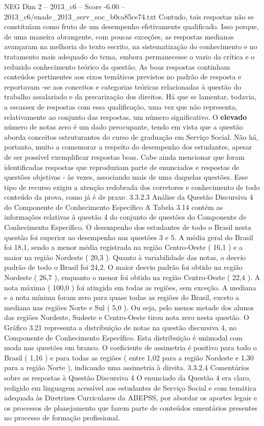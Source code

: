 \begin{textsample}{NEG Dim 2 – 2013\_c6 – Score -6.00 – 2013\_c6/enade\_2013\_serv\_soc\_b0ca85ce74.txt}
Contudo, tais respostas não se constituíam como fruto de um desempenho efetivamente qualificado.
Isso porque, de uma maneira abrangente, com poucas exceções, as respostas medianas avançaram na melhoria do texto escrito, na sistematização do conhecimento e no tratamento mais adequado do tema, embora permanecesse o vazio da crítica e o reduzido conhecimento teórico da questão.
As boas respostas continham conteúdos pertinentes aos eixos temáticos previstos no padrão de resposta e reportavam -se aos conceitos e categorias teóricas relacionadas à questão do trabalho assalariado e da precarização dos direitos.
Há que se lamentar, todavia, a escassez de respostas com essa qualificação, uma vez que não representa, relativamente ao conjunto das respostas, um número significativo.
O \textbf{elevado} número de notas zero é um dado preocupante, tendo em vista que a questão aborda conceitos estruturantes do curso de graduação em Serviço Social.
Não há, portanto, muito a comemorar a respeito do desempenho dos estudantes, apesar de ser possível exemplificar respostas boas.
Cabe ainda mencionar que foram identificadas respostas que reproduziam parte de enunciados e respostas de questões objetivas - às vezes, associando mais de uma daquelas questões.
Esse tipo de recurso exigiu a atenção redobrada dos corretores e conhecimento de todo conteúdo da prova, como já é de praxe. 3.3.2.3 Análise da Questão Discursiva 4 do Componente de Conhecimento Específico A Tabela 3.14 contém as informações relativas à questão 4 do conjunto de questões do Componente de Conhecimento Específico.
O desempenho dos estudantes de todo o Brasil nesta questão foi superior ao desempenho nas questões 3 e 5.
A média geral do Brasil foi 18,1, sendo a menor média registrada na região Centro-Oeste ( 16,1 ) e a maior na região Nordeste ( 20,3 ).
Quanto à variabilidade das notas, o desvio padrão de todo o Brasil foi 24,2.
O maior desvio padrão foi obtido na região Nordeste ( 26,7 ), enquanto o menor foi obtido na região Centro-Oeste ( 22,4 ).
A nota máxima ( 100,0 ) foi atingida em todas as regiões, sem exceção.
A mediana e a nota mínima foram zero para quase todas as regiões do Brasil, exceto a mediana nas regiões Norte e Sul ( 5,0 ).
Ou seja, pelo menos metade dos alunos das regiões Nordeste, Sudeste e Centro-Oeste tirou nota zero nesta questão.
O Gráfico 3.21 representa a distribuição de notas na questão discursiva 4, no Componente de Conhecimento Específico.
Esta distribuição é unimodal com moda nas questões em branco.
O coeficiente de assimetria é positivo para todo o Brasil ( 1,16 ) e para todas as regiões ( entre 1,02 para a região Nordeste e 1,30 para a região Norte ), indicando uma assimetria à direita. 3.3.2.4 Comentários sobre as respostas à Questão Discursiva 4 O enunciado da Questão 4 era claro, redigido em linguagem acessível aos estudantes de Serviço Social e com temática adequada às Diretrizes Curriculares da ABEPSS, por abordar os aportes legais e os processos de planejamento que fazem parte de conteúdos ementários presentes no processo de formação profissional.

\end{textsample}
